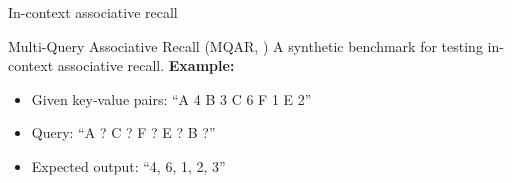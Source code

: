 
\begin{frame}{In-context associative recall}
    \begin{block}{\scriptsize Multi-Query Associative Recall (MQAR, \cite{zoology})}
        \scriptsize
        A synthetic benchmark for testing in-context associative recall.
        \vspace{1mm}
        \textbf{Example:}
        \begin{itemize}
            \item Given key-value pairs: ``A 4 B 3 C 6 F 1 E 2''
            \item Query: ``A ? C ? F ? E ? B ?''  
            \item Expected output: ``4, 6, 1, 2, 3''
        \end{itemize}
    \end{block}
    \vspace{-1mm}
    
\end{frame}
